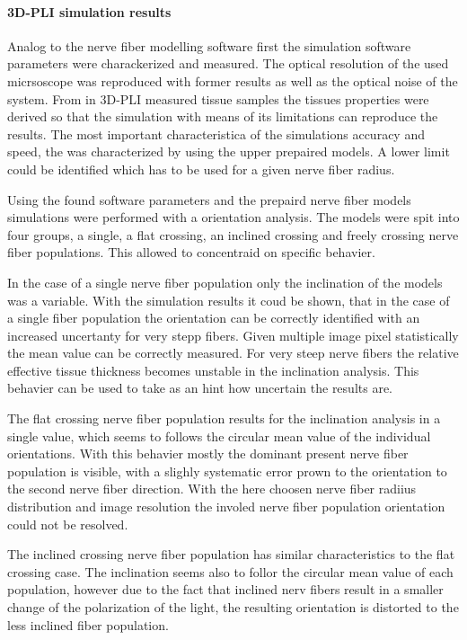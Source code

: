 \paragraph{\acs{3D-PLI} simulation results}
Analog to the nerve fiber modelling software first the simulation software parameters were charackerized and measured.
The optical resolution of the used micrsoscope was reproduced with former results as well as the optical noise of the system.
From in \ac{3D-PLI} measured tissue samples the tissues properties were derived so that the simulation with means of its limitations can reproduce the results.
The most important characteristica of the simulations accuracy and speed, the \Voxelsize{} was characterized by using the upper prepaired models.
A lower limit could be identified which has to be used for a given nerve fiber radius.
\par
% 
Using the found software parameters and the prepaird nerve fiber models simulations were performed with a orientation analysis.
The models were spit into four groups, a single, a flat crossing, an inclined crossing and freely crossing nerve fiber populations.
This allowed to concentraid on specific behavier.
\par
% 
In the case of a single nerve fiber population only the inclination of the models was a variable.
With the simulation results it coud be shown, that in the case of a single fiber population the orientation can be correctly identified with an increased uncertanty for very stepp fibers.
Given multiple image pixel statistically the mean value can be correctly measured.
For very steep nerve fibers the relative effective tissue thickness becomes unstable in the inclination analysis.
This behavier can be used to take as an hint how uncertain the results are.
\par
% 
The flat crossing nerve fiber population results for the inclination analysis in a single value, which seems to follows the circular mean value of the individual orientations.
With this behavier mostly the dominant present nerve fiber population is visible, with a slighly systematic error prown to the orientation to the second nerve fiber direction.
With the here choosen nerve fiber radiius distribution and image resolution the involed nerve fiber population orientation could not be resolved.
\par
% 
The inclined crossing nerve fiber population has similar characteristics to the flat crossing case.
The inclination seems also to follor the circular mean value of each population, however due to the fact that inclined nerv fibers result in a smaller change of the polarization of the light, the resulting orientation is distorted to the less inclined fiber population.
